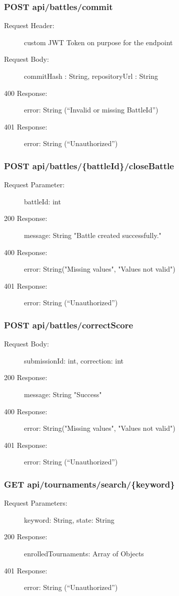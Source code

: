 \documentclass{Configuration_Files/Template}
\begin{document}
\subsubsection{POST api/battles/commit}
\begin{description}
    \item[Request Header:] custom JWT Token on purpose for the endpoint
    \item[Request Body:] commitHash : String, repositoryUrl : String
    \item[400 Response:] error: String (“Invalid or missing BattleId”)
    \item[401 Response:] error: String (“Unauthorized”)
\end{description}

\subsubsection{POST api/battles/\{battleId\}/closeBattle}
\begin{description}
    \item[Request Parameter:] battleId: int
    \item[200 Response:] message: String "Battle created successfully."
    \item[400 Response:] error: String("Missing values", "Values not valid")
    \item[401 Response:] error: String (“Unauthorized”)
\end{description}

\subsubsection{POST api/battles/correctScore}
\begin{description}
    \item[Request Body:] submissionId: int, correction: int
    \item[200 Response:] message: String "Success"
    \item[400 Response:] error: String("Missing values", "Values not valid")
    \item[401 Response:] error: String (“Unauthorized”)
\end{description}


\subsubsection{GET api/tournaments/search/\{keyword\}}
\begin{description}
    \item[Request Parameters:] keyword: String, state: String
    \item[200 Response:] enrolledTournaments: Array of Objects
    \item[401 Response:] error: String (“Unauthorized”)
\end{description}
\end{document}
